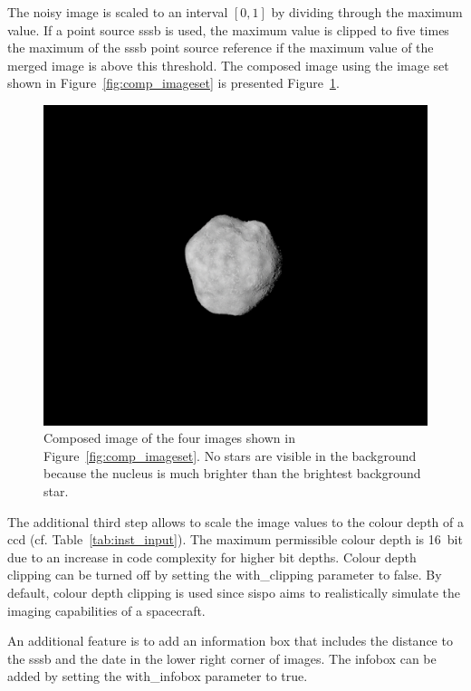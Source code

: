 The noisy image is scaled to an interval $[0,1]$ by dividing through the maximum value. If a point source \gls{sssb} is used, the maximum value is clipped to five times the maximum of the \gls{sssb} point source reference if the maximum value of the merged image is above this threshold. The composed image using the image set shown in Figure~\ref{fig:comp_imageset} is presented Figure~\ref{fig:comp_composed}.

\begin{figure}[htb]
    \centering
    \includegraphics[width=\textwidth]{doc/thesis/0_figures/composition/Comp_2017-08-15T115854-575000.png}
    \caption{Composed image of the four images shown in Figure~\ref{fig:comp_imageset}. No stars are visible in the background because the nucleus is much brighter than the brightest background star.}
    \label{fig:comp_composed}
\end{figure}

The additional third step allows to scale the image values to the colour depth of a \gls{ccd} (cf. Table~\ref{tab:inst_input}). The maximum permissible colour depth is \SI{16}{bit} due to an increase in code complexity for higher bit depths. Colour depth clipping can be turned off by setting the with\_clipping parameter to false. By default, colour depth clipping is used since \gls{sispo} aims to realistically simulate the imaging capabilities of a spacecraft.

An additional feature is to add an information box that includes the distance to the \gls{sssb} and the date in the lower right corner of images. The infobox can be added by setting the with\_infobox parameter to true.

